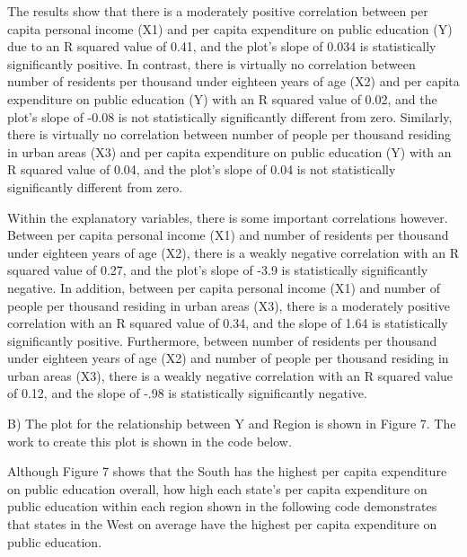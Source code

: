 \documentclass[12pt,letterpaper]{article}
\begin{document}
\vspace{.5cm}
\noindent The results show that there is a moderately positive correlation between per capita personal income (X1) and per capita expenditure on public education (Y) due to an R squared value of 0.41, and the plot’s slope of 0.034 is statistically significantly positive. In contrast, there is virtually no correlation between number of residents per thousand under eighteen years of age (X2) and per capita expenditure on public education (Y) with an R squared value of 0.02, and the plot’s slope of -0.08 is not statistically significantly different from zero. Similarly, there is virtually no correlation between number of people per thousand residing in urban areas (X3) and per capita expenditure on public education (Y) with an R squared value of 0.04, and the plot’s slope of 0.04 is not statistically significantly different from zero.

\vspace{.5cm}

\noindent Within the explanatory variables, there is some important correlations however. Between per capita personal income (X1) and number of residents per thousand under eighteen years of age (X2), there is a weakly negative correlation with an R squared value of 0.27, and the plot’s slope of -3.9 is statistically significantly negative. In addition, between per capita personal income (X1) and number of people per thousand residing in urban areas (X3), there is a moderately positive correlation with an R squared value of 0.34, and the slope of 1.64 is statistically significantly positive. Furthermore, between number of residents per thousand under eighteen years of age (X2) and number of people per thousand residing in urban areas (X3), there is a weakly negative correlation with an R squared value of 0.12, and the slope of -.98 is statistically significantly negative.

\vspace{.5cm}

\noindent B) The plot for the relationship between Y and Region is shown in Figure 7. The work to create this plot is shown in the code below.

\vspace{.5cm}

  

\vspace{.5cm}

\noindent Although Figure 7 shows that the South has the highest per capita expenditure on public education overall, how high each state's per capita expenditure on public education within each region shown in the following code demonstrates that states in the West on average have the highest per capita expenditure on public education.
\end{document}
